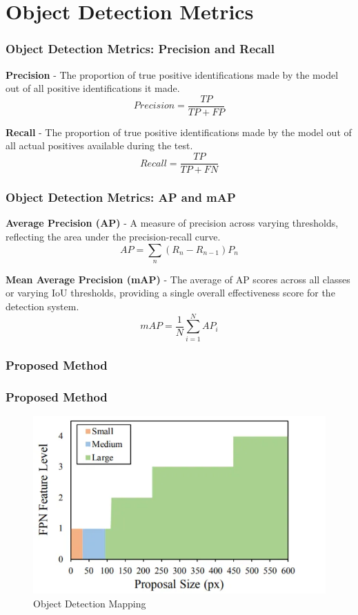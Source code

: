\documentclass{beamer}
\begin{document}
\section{Object Detection Metrics}
\begin{frame}
  \frametitle{Object Detection Metrics: Precision and Recall}
  \textbf{Precision} - The proportion of true positive identifications made by the model out of all positive identifications it made.
  \[
  Precision = \frac{TP}{TP + FP}
  \]
  
  \textbf{Recall} - The proportion of true positive identifications made by the model out of all actual positives available during the test.
  \[
  Recall = \frac{TP}{TP + FN}
  \]
\end{frame}


\begin{frame}
  \frametitle{Object Detection Metrics: AP and mAP}
  \textbf{Average Precision (AP)} - A measure of precision across varying thresholds, reflecting the area under the precision-recall curve.
  \[
  AP = \sum_{n} (R_n - R_{n-1}) P_n
  \]
  
  \textbf{Mean Average Precision (mAP)} - The average of AP scores across all classes or varying IoU thresholds, providing a single overall effectiveness score for the detection system.
  \[
  mAP = \frac{1}{N} \sum_{i=1}^{N} AP_i
  \]
\end{frame}




\begin{frame}
  \frametitle{Proposed Method}
  \frametitle{Proposed Method}
  \begin{figure}[h!]
    \centering
    \includegraphics[scale=0.5]{Figures/efpn-sod-mapping.jpg}
    \caption{Object Detection Mapping}
    \label{fig:sod-problem}
  \end{figure}
\end{frame}
\end{document}
